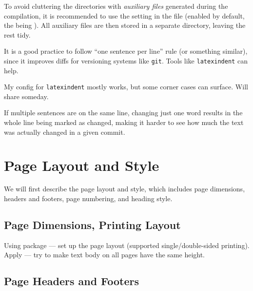 \begin{remark}
    To avoid cluttering the directories with \emph{auxiliary files} generated during the compilation, it is recommended to use the  setting in the  file (enabled by default, the  being ).
    All auxiliary files are then stored in a separate directory, leaving the rest tidy.
\end{remark}

\begin{remark}
    It is a good practice to follow \enquote{one sentence per line} rule (or something similar), since it improves diffs for versioning systems like \texttt{git}.
    Tools like \texttt{latexindent} can help.
    \begin{Note}
        My config for \texttt{latexindent} mostly works, but some corner cases can surface.
        Will share someday.
    \end{Note}
    If multiple sentences are on the same line, changing just one word results in the whole line being marked as changed, making it harder to see how much the text was actually changed in a given commit.
\end{remark}



\section{Page Layout and Style}%
\label{sec:Page Layout}

We will first describe the page layout and style, which includes page dimensions, headers and footers, page numbering, and heading style.

\subsection{Page Dimensions, Printing Layout}%
\label{sub:Page Dimensions}

Using  package --- set up the page layout (supported single/double-sided printing).
Apply \macro{\flushbottom} --- try to make text body on all pages have the same height.

\subsection{Page Headers and Footers}%
\label{sub:Headers Footers}

